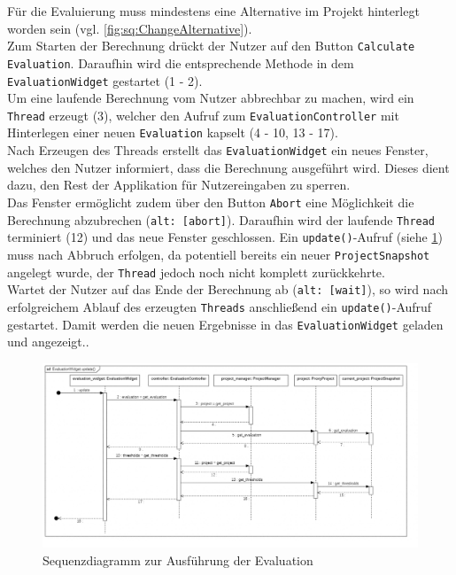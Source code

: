 \documentclass{article}
\begin{document}
Für die Evaluierung muss mindestens eine Alternative im Projekt hinterlegt worden sein (vgl. \ref{fig:sq:ChangeAlternative}). \\
Zum Starten der Berechnung drückt der Nutzer auf den Button \texttt{Calculate Evaluation}. Daraufhin wird die entsprechende Methode in dem \texttt{EvaluationWidget} gestartet (1 - 2). \\
Um eine laufende Berechnung vom Nutzer abbrechbar zu machen, wird ein \texttt{Thread} erzeugt (3), welcher den Aufruf zum \texttt{EvaluationController} mit Hinterlegen einer neuen \texttt{Evaluation} kapselt (4 - 10, 13 - 17). \\
Nach Erzeugen des Threads erstellt das \texttt{EvaluationWidget} ein neues Fenster, welches den Nutzer informiert, dass die Berechnung ausgeführt wird. Dieses dient dazu, den Rest der Applikation für Nutzereingaben zu sperren. \\
Das Fenster ermöglicht zudem über den Button \texttt{Abort} eine Möglichkeit die Berechnung abzubrechen (\texttt{alt: [abort]}). Daraufhin wird der laufende \texttt{Thread} terminiert (12) und das neue Fenster geschlossen. Ein \texttt{update()}-Aufruf (siehe \ref{fig:sq:UpdateEvaluationWidget}) muss nach Abbruch erfolgen, da potentiell bereits ein neuer \texttt{ProjectSnapshot} angelegt wurde, der \texttt{Thread} jedoch noch nicht komplett zurückkehrte. \\
Wartet der Nutzer auf das Ende der Berechnung ab (\texttt{alt: [wait]}), so wird nach erfolgreichem Ablauf des erzeugten \texttt{Threads} anschließend ein \texttt{update()}-Aufruf gestartet. Damit werden die neuen Ergebnisse in das \texttt{EvaluationWidget} geladen und angezeigt..


\begin{figure}[H]%
    \centering
    \includegraphics[width=13cm]{entwurf/Entwurf_dokument/img/Damian/EvaluationWidget.update().png}
    \caption{Sequenzdiagramm zur Ausführung der Evaluation}
    \label{fig:sq:UpdateEvaluationWidget}
\end{figure}
\end{document}
